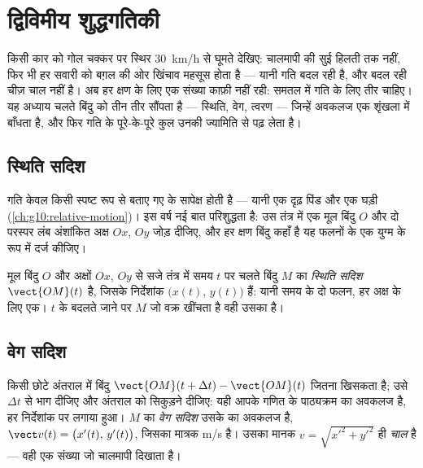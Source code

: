 \chapter{द्विविमीय शुद्धगतिकी}\label{ch:g12:kinematics-2d}

किसी कार को गोल चक्कर पर स्थिर \qty{30}{km/h} से घूमते देखिए: चालमापी की सुई हिलती तक
नहीं, फिर भी हर सवारी को बग़ल की ओर खिंचाव महसूस होता है --- यानी गति बदल रही
है, और बदल रही चीज़ चाल नहीं है। अब हर क्षण के लिए एक संख्या काफ़ी नहीं
रही: समतल में गति के लिए तीर चाहिए। यह अध्याय चलते बिंदु को तीन तीर सौंपता है
--- स्थिति, वेग, त्वरण --- जिन्हें अवकलज एक शृंखला में बाँधता है, और फिर गति
के पूरे-के-पूरे कुल उनकी ज्यामिति से पढ़ लेता है।

\section{स्थिति सदिश}

गति केवल किसी स्पष्ट रूप से बताए गए  के सापेक्ष होती है ---
यानी एक दृढ़ पिंड और एक घड़ी (\cref{ch:g10:relative-motion})। इस वर्ष नई बात परिशुद्धता है: उस तंत्र
में एक मूल बिंदु $O$ और दो परस्पर लंब अंशांकित अक्ष $Ox$, $Oy$ जोड़ दीजिए,
और हर क्षण बिंदु कहाँ है यह फलनों के एक युग्म के रूप में दर्ज कीजिए।

\begin{definition}[स्थिति सदिश]\label{def:g12:kinematics-2d:position}
मूल बिंदु $O$ और अक्षों $Ox$, $Oy$ से सजे तंत्र में समय $t$ पर चलते
बिंदु $M$ का \emph{स्थिति सदिश} $\vect{OM}(t)$ है, जिसके
निर्देशांक $\bigl(x(t),\, y(t)\bigr)$ हैं: यानी समय के दो फलन, हर अक्ष के लिए एक। $t$ के बदलते
जाने पर $M$ जो वक्र खींचता है वही उसका  है।
\end{definition}

\section{वेग सदिश}

\begin{definition}[वेग सदिश]\label{def:g12:kinematics-2d:velocity}
किसी छोटे अंतराल में बिंदु $\vect{OM}(t+\Delta t) - \vect{OM}(t)$ जितना खिसकता है; उसे $\Delta t$ से भाग दीजिए और
अंतराल को सिकुड़ने दीजिए: यही आपके गणित के पाठ्यक्रम का अवकलज है, हर निर्देशांक
पर लगाया हुआ। $M$ का \emph{वेग सदिश} उसके  का अवकलज है, $\vect v(t) = \bigl(x'(t),\, y'(t)\bigr)$, जिसका मात्रक \unit{m/s} है। उसका मानक $v = \sqrt{x'^2 + y'^2}$ ही
\emph{चाल} है --- वही एक संख्या जो चालमापी दिखाता है।
\end{definition}

